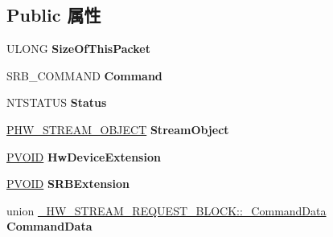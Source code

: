 \subsection*{Public 属性}
\begin{DoxyCompactItemize}
\item 
\mbox{\label{struct___h_w___s_t_r_e_a_m___r_e_q_u_e_s_t___b_l_o_c_k_a238f932c305bfd786b4ab3e8d15d8eaa}} 
U\+L\+O\+NG {\bfseries Size\+Of\+This\+Packet}
\item 
\mbox{\label{struct___h_w___s_t_r_e_a_m___r_e_q_u_e_s_t___b_l_o_c_k_a42a59f48d393f22c85a927527b25293f}} 
S\+R\+B\+\_\+\+C\+O\+M\+M\+A\+ND {\bfseries Command}
\item 
\mbox{\label{struct___h_w___s_t_r_e_a_m___r_e_q_u_e_s_t___b_l_o_c_k_a7e2143bd94169fd27b02d35c66af44d6}} 
N\+T\+S\+T\+A\+T\+US {\bfseries Status}
\item 
\mbox{\label{struct___h_w___s_t_r_e_a_m___r_e_q_u_e_s_t___b_l_o_c_k_a3615b6ed27db600796c2cc84fa51ac6d}} 
\hyperlink{struct___h_w___s_t_r_e_a_m___o_b_j_e_c_t}{P\+H\+W\+\_\+\+S\+T\+R\+E\+A\+M\+\_\+\+O\+B\+J\+E\+CT} {\bfseries Stream\+Object}
\item 
\mbox{\label{struct___h_w___s_t_r_e_a_m___r_e_q_u_e_s_t___b_l_o_c_k_a608df4e2044281f60bf79aeb470fefa1}} 
\hyperlink{interfacevoid}{P\+V\+O\+ID} {\bfseries Hw\+Device\+Extension}
\item 
\mbox{\label{struct___h_w___s_t_r_e_a_m___r_e_q_u_e_s_t___b_l_o_c_k_a055619e4bc215dd30cf26a06729450f4}} 
\hyperlink{interfacevoid}{P\+V\+O\+ID} {\bfseries S\+R\+B\+Extension}
\item 
\mbox{\label{struct___h_w___s_t_r_e_a_m___r_e_q_u_e_s_t___b_l_o_c_k_a3e86dbfc1ba993c16798cacf363b25c8}} 
union \hyperlink{union___h_w___s_t_r_e_a_m___r_e_q_u_e_s_t___b_l_o_c_k_1_1___command_data}{\+\_\+\+H\+W\+\_\+\+S\+T\+R\+E\+A\+M\+\_\+\+R\+E\+Q\+U\+E\+S\+T\+\_\+\+B\+L\+O\+C\+K\+::\+\_\+\+Command\+Data} {\bfseries Command\+Data}

\end{DoxyCompactItemize}
